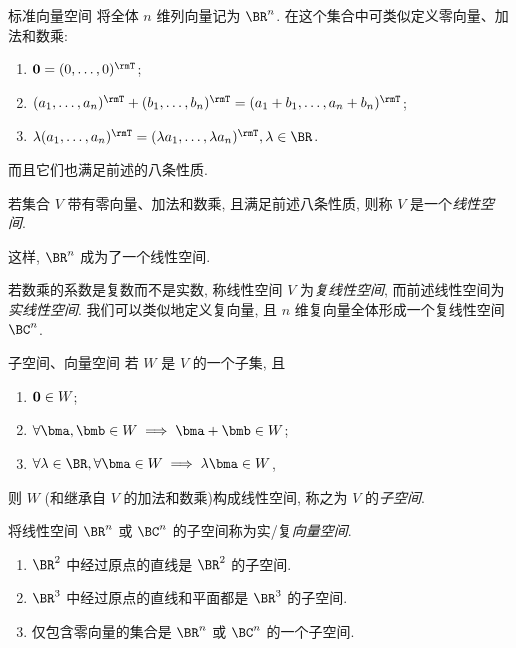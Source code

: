 \begin{frame}{标准向量空间}
	\onslide<+->
	将全体 $n$ 维列向量记为 $\BR^n$.
	\onslide<+->
	在这个集合中可类似定义零向量、加法和数乘:
	\begin{enumerate}
		\item ${\bf0}=(0,\dots,0)^\rmT$;
		\item $(a_1,\dots,a_n)^\rmT+(b_1,\dots,b_n)^\rmT=(a_1+b_1,\dots,a_n+b_n)^\rmT$;
		\item $\lambda(a_1,\dots,a_n)^\rmT=(\lambda a_1,\dots,\lambda a_n)^\rmT,\lambda\in\BR$.
	\end{enumerate}
	\onslide<+->
	而且它们也满足前述的八条性质.
	\onslide<+->
	\begin{definition}
		若集合 $V$ 带有零向量、加法和数乘, 且满足前述八条性质, 则称 $V$ 是一个\emph{线性空间}.
	\end{definition}
	\onslide<+->
	这样, $\BR^n$ 成为了一个线性空间.

	\onslide<+->
	若数乘的系数是复数而不是实数, 称线性空间 $V$ 为\emph{复线性空间}, 而前述线性空间为\emph{实线性空间}.
	\onslide<+->
	我们可以类似地定义复向量, 且 $n$ 维复向量全体形成一个复线性空间 $\BC^n$.
\end{frame}


\begin{frame}{子空间、向量空间\noexer}
	\onslide<+->
	若 $W$ 是 $V$ 的一个子集, 且
	\begin{enumerate}
		\item ${\bf0}\in W$;
		\item $\forall\bma,\bmb\in W\implies \bma+\bmb\in W$;
		\item $\forall\lambda\in\BR,\forall\bma\in W\implies \lambda\bma\in W$,
	\end{enumerate}
	\onslide<+->
	则 $W$ (和继承自 $V$ 的加法和数乘)构成线性空间, 称之为 $V$ 的\emph{子空间}.

	\onslide<+->
	将线性空间 $\BR^n$ 或 $\BC^n$ 的子空间称为实/复\emph{向量空间}.
	\onslide<+->
	\begin{example}
		\begin{enumerate}
			\item $\BR^2$ 中经过原点的直线是 $\BR^2$ 的子空间.
			\item $\BR^3$ 中经过原点的直线和平面都是 $\BR^3$ 的子空间. 
			\item 仅包含零向量的集合是 $\BR^n$ 或 $\BC^n$ 的一个子空间.
		\end{enumerate}
	\end{example}
\end{frame}


